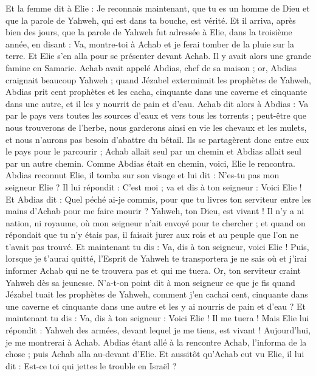 \begin{multicols}{2}
Et la femme dit à Elie : Je reconnais maintenant, que tu es un homme de Dieu et que la parole de Yahweh, qui est dans ta bouche, est vérité.
\VerseOne{}Et il arriva, après bien des jours, que la parole de Yahweh fut adressée à Elie, dans la troisième année, en disant : Va, montre-toi à Achab et je ferai tomber de la pluie sur la terre.
Et Elie s'en alla pour se présenter devant Achab. Il y avait alors une grande famine en Samarie.
Achab avait appelé Abdias, chef de sa maison ; or, Abdias craignait beaucoup Yahweh ;
quand Jézabel exterminait les prophètes de Yahweh, Abdias prit cent prophètes et les cacha, cinquante dans une caverne et cinquante dans une autre, et il les y nourrit de pain et d'eau.
Achab dit alors à Abdias : Va par le pays vers toutes les sources d'eaux et vers tous les torrents ; peut-être que nous trouverons de l'herbe, nous garderons ainsi en vie les chevaux et les mulets, et nous n’aurons pas besoin d’abattre du bétail.
Ils se partagèrent donc entre eux le pays pour le parcourir ; Achab allait seul par un chemin et Abdias allait seul par un autre chemin.
Comme Abdias était en chemin, voici, Elie le rencontra. Abdias reconnut Elie, il tomba sur son visage et lui dit : N'es-tu pas mon seigneur Elie ?
Il lui répondit : C'est moi ; va et dis à ton seigneur : Voici Elie !
Et Abdias dit : Quel péché ai-je commis, pour que tu livres ton serviteur entre les mains d'Achab pour me faire mourir ?
Yahweh, ton Dieu, est vivant ! Il n'y a ni nation, ni royaume, où mon seigneur n'ait envoyé pour te chercher ; et quand on répondait que tu n'y étais pas, il faisait jurer aux rois et au peuple que l'on ne t’avait pas trouvé.
Et maintenant tu dis : Va, dis à ton seigneur, voici Elie !
Puis, lorsque je t’aurai quitté, l'Esprit de Yahweh te transportera je ne sais où et j’irai informer Achab qui ne te trouvera pas et qui me tuera. Or, ton serviteur craint Yahweh dès sa jeunesse.
N'a-t-on point dit à mon seigneur ce que je fis quand Jézabel tuait les prophètes de Yahweh, comment j'en cachai cent, cinquante dans une caverne et cinquante dans une autre et les y ai nourris de pain et d'eau ?
Et maintenant tu dis : Va, dis à ton seigneur : Voici Elie ! Il me tuera !
Mais Elie lui répondit : Yahweh des armées, devant lequel je me tiens, est vivant ! Aujourd'hui, je me montrerai à Achab.
Abdias étant allé à la rencontre Achab, l’informa de la chose ; puis Achab alla au-devant d'Elie.
Et aussitôt qu'Achab eut vu Elie, il lui dit : Est-ce toi qui jettes le trouble en Israël ?

\end{multicols}
